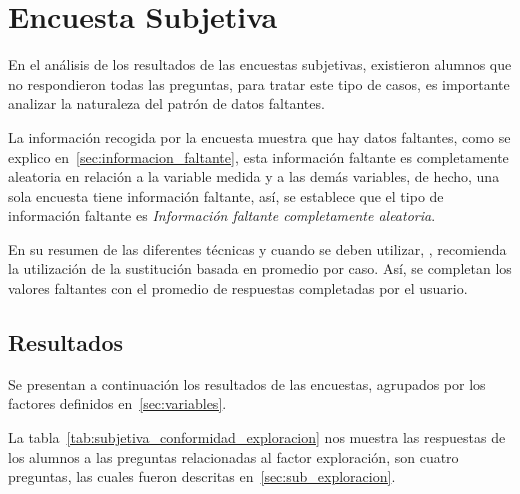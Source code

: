 
\section{Encuesta Subjetiva}

En el análisis de los resultados de las encuestas subjetivas, existieron alumnos
que no respondieron todas las preguntas, para tratar este tipo de casos, es
importante analizar la naturaleza del patrón de datos
faltantes\cite{carpita2011imputation}. 

La información recogida por la encuesta muestra que hay datos faltantes, como se
explico en~\ref{sec:informacion_faltante}, esta información faltante es
completamente aleatoria en relación a la variable medida y a las demás
variables, de hecho, una sola encuesta tiene información faltante, así, se
establece que el tipo de información faltante es \emph{Información faltante
    completamente aleatoria}.

En su resumen de las diferentes técnicas y cuando se deben utilizar,
\cite{tsikriktsis2005review}, recomienda la utilización de la sustitución basada
en promedio por caso. Así, se completan los valores faltantes con el promedio de
respuestas completadas por el usuario.

\subsection{Resultados}

Se presentan a continuación los resultados de las encuestas, agrupados por los
factores definidos en~\ref{sec:variables}.

La tabla~\ref{tab:subjetiva_conformidad_exploracion} nos muestra las respuestas
de los alumnos a las preguntas relacionadas al factor exploración, son cuatro
preguntas, las cuales fueron descritas en~\ref{sec:sub_exploracion}. 

